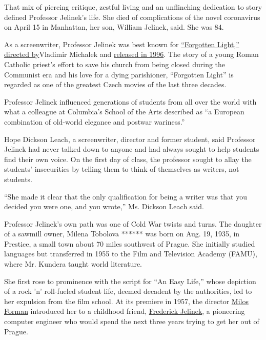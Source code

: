 That mix of piercing critique, zestful living and an unflinching
dedication to story defined Professor Jelinek's life. She died of
complications of the novel coronavirus on April 15 in Manhattan, her
son, William Jelinek, said. She was 84.

As a screenwriter, Professor Jelinek was best known for
\href{http://new-york.czechcentres.cz/program/event-details/forgotten-light/}{``Forgotten
Light,'' directed by}Vladimir Michalek and
\href{http://new-york.czechcentres.cz/program/event-details/forgotten-light/}{released
in 1996}. The story of a young Roman Catholic priest's effort to save
his church from being closed during the Communist era and his love for a
dying parishioner, ``Forgotten Light'' is regarded as one of the
greatest Czech movies of the last three decades.

Professor Jelinek influenced generations of students from all over the
world with what a colleague at Columbia's School of the Arts described
as ``a European combination of old-world elegance and postwar
wariness.''

Hope Dickson Leach, a screenwriter, director and former student, said
Professor Jelinek had never talked down to anyone and had always sought
to help students find their own voice. On the first day of class, the
professor sought to allay the students' insecurities by telling them to
think of themselves as writers, not students.

``She made it clear that the only qualification for being a writer was
that you decided you were one, and you wrote,'' Ms. Dickson Leach said.

Professor Jelinek's own path was one of Cold War twists and turns. The
daughter of a sawmill owner, Milena Tobolova ****** was born on Aug. 19,
1935, in Prestice, a small town about 70 miles southwest of Prague. She
initially studied languages but transferred in 1955 to the Film and
Television Academy (FAMU), where Mr. Kundera taught world literature.

She first rose to prominence with the script for ``An Easy Life,'' whose
depiction of a rock 'n' roll-fueled student life, deemed decadent by the
authorities, led to her expulsion from the film school. At its premiere
in 1957, the director
\href{https://www.nytimes.com/2018/04/14/obituaries/milos-forman-dead.html}{Milos
Forman} introduced her to a childhood friend,
\href{https://www.nytimes.com/2010/09/24/business/24jelinek.html}{Frederick
Jelinek}, a pioneering computer engineer who would spend the next three
years trying to get her out of Prague.

